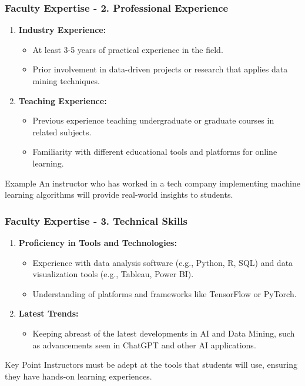 \documentclass[aspectratio=169]{beamer}
\begin{document}
\begin{frame}[fragile]
    \frametitle{Faculty Expertise - 2. Professional Experience}
    \begin{enumerate}
        \item \textbf{Industry Experience:}
          \begin{itemize}
              \item At least 3-5 years of practical experience in the field.
              \item Prior involvement in data-driven projects or research that applies data mining techniques.
          \end{itemize}
        \item \textbf{Teaching Experience:}
          \begin{itemize}
              \item Previous experience teaching undergraduate or graduate courses in related subjects.
              \item Familiarity with different educational tools and platforms for online learning.
          \end{itemize}
    \end{enumerate}
    \begin{block}{Example}
        An instructor who has worked in a tech company implementing machine learning algorithms will provide real-world insights to students.
    \end{block}
\end{frame}

\begin{frame}[fragile]
    \frametitle{Faculty Expertise - 3. Technical Skills}
    \begin{enumerate}
        \item \textbf{Proficiency in Tools and Technologies:}
          \begin{itemize}
              \item Experience with data analysis software (e.g., Python, R, SQL) and data visualization tools (e.g., Tableau, Power BI).
              \item Understanding of platforms and frameworks like TensorFlow or PyTorch.
          \end{itemize}
        \item \textbf{Latest Trends:}
          \begin{itemize}
              \item Keeping abreast of the latest developments in AI and Data Mining, such as advancements seen in ChatGPT and other AI applications.
          \end{itemize}
    \end{enumerate}
    \begin{block}{Key Point}
        Instructors must be adept at the tools that students will use, ensuring they have hands-on learning experiences.
    \end{block}
\end{frame}
\end{document}
